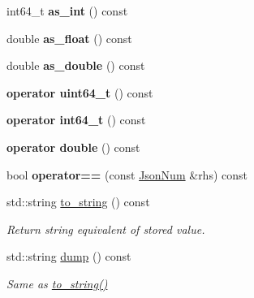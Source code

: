 \begin{DoxyCompactItemize}
\item 
\mbox{\label{classnta_1_1utils_1_1JsonNum_a0467c186ef4b7e9e72f703e1cd165737}} 
int64\+\_\+t {\bfseries as\+\_\+int} () const
\item 
\mbox{\label{classnta_1_1utils_1_1JsonNum_a5ca1010f8bfd27569f5cb2ddabacded7}} 
double {\bfseries as\+\_\+float} () const
\item 
\mbox{\label{classnta_1_1utils_1_1JsonNum_a7853ed40074bf81aa5cc0d139df753aa}} 
double {\bfseries as\+\_\+double} () const
\item 
\mbox{\label{classnta_1_1utils_1_1JsonNum_a01eada48d909adc6edef2dbe75809b9e}} 
{\bfseries operator uint64\+\_\+t} () const
\item 
\mbox{\label{classnta_1_1utils_1_1JsonNum_a5d31c8dcc19bf7d03c83b547b922806f}} 
{\bfseries operator int64\+\_\+t} () const
\item 
\mbox{\label{classnta_1_1utils_1_1JsonNum_ac71592324ce19e5c2da0d2b130243bab}} 
{\bfseries operator double} () const
\item 
\mbox{\label{classnta_1_1utils_1_1JsonNum_afd53b30172e0414c7ca735d7d4118877}} 
bool {\bfseries operator==} (const \hyperlink{classnta_1_1utils_1_1JsonNum}{Json\+Num} \&rhs) const
\item 
\mbox{\label{classnta_1_1utils_1_1JsonNum_a7038acc17c49e0162d6462dc0591a82d}} 
std\+::string \hyperlink{classnta_1_1utils_1_1JsonNum_a7038acc17c49e0162d6462dc0591a82d}{to\+\_\+string} () const
\begin{DoxyCompactList}\small\item\em Return string equivalent of stored value. \end{DoxyCompactList}\item 
\mbox{\label{classnta_1_1utils_1_1JsonNum_a304a9adefcdf875554ef0bd04225594a}} 
std\+::string \hyperlink{classnta_1_1utils_1_1JsonNum_a304a9adefcdf875554ef0bd04225594a}{dump} () const
\begin{DoxyCompactList}\small\item\em Same as \hyperlink{classnta_1_1utils_1_1JsonNum_a7038acc17c49e0162d6462dc0591a82d}{to\+\_\+string()} \end{DoxyCompactList}\end{DoxyCompactItemize}
